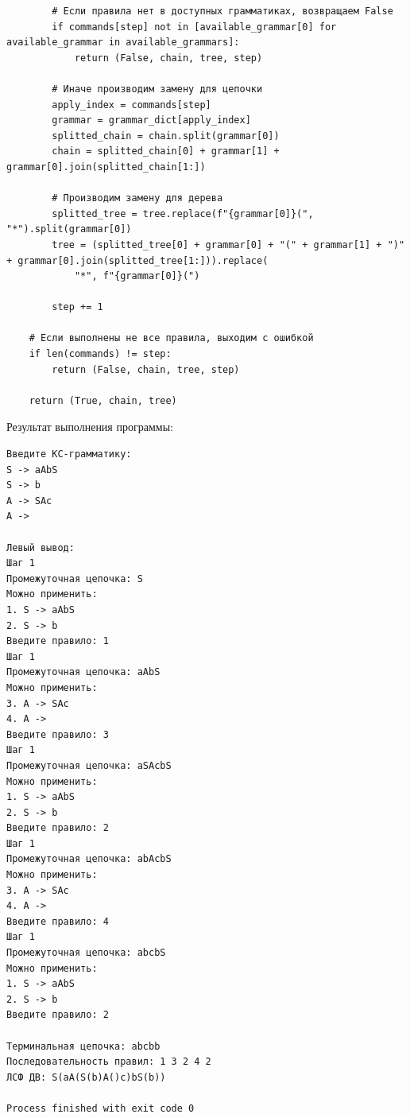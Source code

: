\documentclass[a4paper,14pt]{extarticle}
\begin{document}
\begin{enumerate}[1.]
\begin{verbatim}
        # Если правила нет в доступных грамматиках, возвращаем False
        if commands[step] not in [available_grammar[0] for available_grammar in available_grammars]:
            return (False, chain, tree, step)

        # Иначе производим замену для цепочки
        apply_index = commands[step]
        grammar = grammar_dict[apply_index]
        splitted_chain = chain.split(grammar[0])
        chain = splitted_chain[0] + grammar[1] + grammar[0].join(splitted_chain[1:])

        # Производим замену для дерева
        splitted_tree = tree.replace(f"{grammar[0]}(", "*").split(grammar[0])
        tree = (splitted_tree[0] + grammar[0] + "(" + grammar[1] + ")" + grammar[0].join(splitted_tree[1:])).replace(
            "*", f"{grammar[0]}(")

        step += 1

    # Если выполнены не все правила, выходим с ошибкой
    if len(commands) != step:
        return (False, chain, tree, step)

    return (True, chain, tree)
\end{verbatim}
          Результат выполнения программы:
          \begin{verbatim}
Введите КС-грамматику:
S -> aAbS
S -> b
A -> SAc
A -> 

Левый вывод: 
Шаг 1
Промежуточная цепочка: S
Можно применить:
1. S -> aAbS
2. S -> b
Введите правило: 1
Шаг 1
Промежуточная цепочка: aAbS
Можно применить:
3. A -> SAc
4. A -> 
Введите правило: 3
Шаг 1
Промежуточная цепочка: aSAcbS
Можно применить:
1. S -> aAbS
2. S -> b
Введите правило: 2
Шаг 1
Промежуточная цепочка: abAcbS
Можно применить:
3. A -> SAc
4. A -> 
Введите правило: 4
Шаг 1
Промежуточная цепочка: abcbS
Можно применить:
1. S -> aAbS
2. S -> b
Введите правило: 2

Терминальная цепочка: abcbb
Последовательность правил: 1 3 2 4 2
ЛСФ ДВ: S(aA(S(b)A()c)bS(b))

Process finished with exit code 0
    \end{verbatim}






\end{enumerate}
\end{document}
